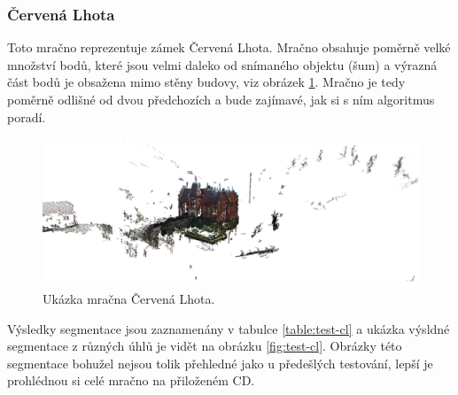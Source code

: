 \documentclass[11pt,twoside,a4paper]{book}
\begin{document}
\cleardoublepage
\subsubsection{Červená Lhota}

Toto mračno reprezentuje zámek Červená Lhota. Mračno obsahuje poměrně velké množství bodů, které jsou velmi daleko od snímaného objektu (šum) a výrazná část bodů je obsažena mimo stěny budovy, viz obrázek \ref{fig:cervena-lhota}. Mračno je tedy poměrně odlišné od dvou předchozích a bude zajímavé, jak si s ním algoritmus poradí.

\begin{figure}[H]
\begin{center}
\includegraphics[width=\textwidth]{figures/cervena-lhota}
\caption{Ukázka mračna Červená Lhota.}
\label{fig:cervena-lhota}
\end{center}
\end{figure}

Výsledky segmentace jsou zaznamenány v tabulce \ref{table:test-cl} a ukázka výsldné segmentace z různých úhlů je vidět na obrázku \ref{fig:test-cl}. Obrázky této segmentace bohužel nejsou tolik přehledné jako u předešlých testování, lepší je prohlédnou si celé mračno na přiloženém CD.
\end{document}
